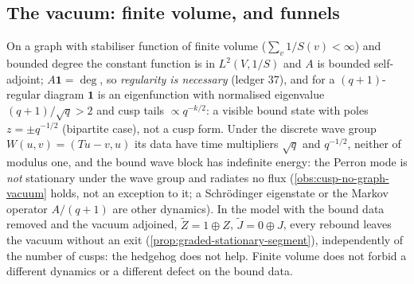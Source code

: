 \subsection{The vacuum: finite volume, and funnels}

\begin{proposition}
\label{prop:constant-mode-no-exit}
On a graph with stabiliser function of finite volume ($\sum_v1/S(v)<\infty$) and bounded degree the constant
function is in $L^2(V,1/S)$ and $A$ is bounded self-adjoint; $A\mathbf 1 = \deg$, so \emph{regularity is
necessary} (ledger 37), and for a $(q+1)$-regular diagram $\mathbf 1$ is an eigenfunction with normalised
eigenvalue $(q+1)/\sqrt q>2$ and cusp tails $\propto q^{-k/2}$: a visible bound state with poles $z = \pm q^{-1/2}$
(bipartite case), not a cusp form. Under the discrete wave group $W(u,v) = (Tu-v,u)$ its data have time
multipliers $\sqrt q$ and $q^{-1/2}$, neither of modulus one, and the bound wave block has indefinite energy: the
Perron mode is \emph{not} stationary under the wave group and radiates no flux (\cref{obs:cusp-no-graph-vacuum}
holds, not an exception to it; a Schrödinger eigenstate or the Markov operator $A/(q+1)$ are other dynamics).
In the model with the bound data removed and the vacuum adjoined, $\tilde Z = 1\oplus Z$, $\tilde J = 0\oplus J$, every
rebound leaves the vacuum without an exit (\cref{prop:graded-stationary-segment}), independently of the number of
cusps: the hedgehog does not help. Finite volume does not forbid a different dynamics or a different defect on the
bound data.
\end{proposition}

